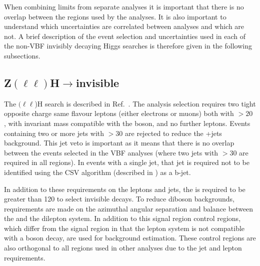 When combining limits from separate analyses it is important that there is no overlap between the regions used by the analyses. It is also important to understand which uncertainties are correlated between analyses and which are not. A brief description of the event selection and uncertainties used in each of the non-\ac{VBF} invisibly decaying Higgs searches is therefore given in the following subsections. 


\subsection{Z$(\ell\ell)$H$\rightarrow$invisible}
\label{sec:zllh}
The \PZ$(\ell\ell$)H search is described in Ref.~\cite{CMS-PAS-HIG-13-018}. The analysis selection requires two tight opposite charge same flavour leptons (either electrons or muons) both with \pt$>20$ \GeV, with invariant mass compatible with the \PZ boson, and no further leptons. Events containing two or more jets with \pt$>30$ \GeV are rejected to reduce the \PZ+jets background. This jet veto is important as it means that there is no overlap between the events selected in the \ac{VBF} analyses (where two jets with \pt$>30$ \GeV are required in all regions). In events with a single jet, that jet is required not to be identified using the \ac{CSV} algorithm (described in ) as a b-jet.

In addition to these requirements on the leptons and jets,  the \MET is required to be greater than 120 \GeV to select invisible decays. To reduce diboson backgrounds, requirements are made on the azimuthal angular separation and \pt balance between the \MET and the dilepton system. In addition to this signal region control regions, which differ from the signal region in that the lepton system is not compatible with a \PZ boson decay, are used for background estimation. These control regions are also orthogonal to all regions used in other analyses due to the jet and lepton requirements.



